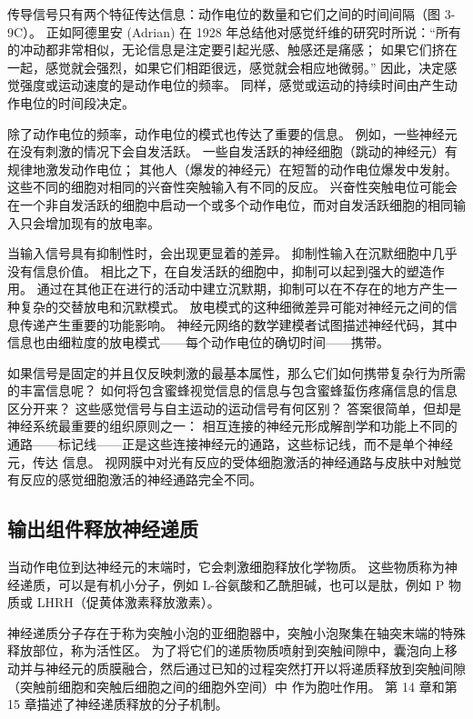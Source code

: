 传导信号只有两个特征传达信息：动作电位的数量和它们之间的时间间隔（图 3-9C）。 
正如阿德里安 (Adrian) 在 1928 年总结他对感觉纤维的研究时所说：“所有的冲动都非常相似，无论信息是注定要引起光感、触感还是痛感； 如果它们挤在一起，感觉就会强烈，如果它们相距很远，感觉就会相应地微弱。” 
因此，决定感觉强度或运动速度的是动作电位的频率。 
同样，感觉或运动的持续时间由产生动作电位的时间段决定。


除了动作电位的频率，动作电位的模式也传达了重要的信息。 
例如，一些神经元在没有刺激的情况下会自发活跃。 
一些自发活跃的神经细胞（跳动的神经元）有规律地激发动作电位； 其他人（爆发的神经元）在短暂的动作电位爆发中发射。 
这些不同的细胞对相同的兴奋性突触输入有不同的反应。 
兴奋性突触电位可能会在一个非自发活跃的细胞中启动一个或多个动作电位，而对自发活跃细胞的相同输入只会增加现有的放电率。


当输入信号具有抑制性时，会出现更显着的差异。 抑制性输入在沉默细胞中几乎没有信息价值。 
相比之下，在自发活跃的细胞中，抑制可以起到强大的塑造作用。 
通过在其他正在进行的活动中建立沉默期，抑制可以在不存在的地方产生一种复杂的交替放电和沉默模式。 
放电模式的这种细微差异可能对神经元之间的信息传递产生重要的功能影响。 
神经元网络的数学建模者试图描述神经代码，其中信息也由细粒度的放电模式——每个动作电位的确切时间——携带。


如果信号是固定的并且仅反映刺激的最基本属性，那么它们如何携带复杂行为所需的丰富信息呢？ 
如何将包含蜜蜂视觉信息的信息与包含蜜蜂蜇伤疼痛信息的信息区分开来？
这些感觉信号与自主运动的运动信号有何区别？ 
答案很简单，但却是神经系统最重要的组织原则之一：
相互连接的神经元形成解剖学和功能上不同的通路——标记线——正是这些连接神经元的通路，这些标记线，而不是单个神经元，传达 信息。 
视网膜中对光有反应的受体细胞激活的神经通路与皮肤中对触觉有反应的感觉细胞激活的神经通路完全不同。


\subsection{输出组件释放神经递质}
当动作电位到达神经元的末端时，它会刺激细胞释放化学物质。 
这些物质称为神经递质，可以是有机小分子，例如 L-谷氨酸和乙酰胆碱，也可以是肽，例如 P 物质或 LHRH（促黄体激素释放激素）。


神经递质分子存在于称为突触小泡的亚细胞器中，突触小泡聚集在轴突末端的特殊释放部位，称为活性区。 
为了将它们的递质物质喷射到突触间隙中，囊泡向上移动并与神经元的质膜融合，然后通过已知的过程突然打开以将递质释放到突触间隙（突触前细胞和突触后细胞之间的细胞外空间）中 作为胞吐作用。 
第 14 章和第 15 章描述了神经递质释放的分子机制。


